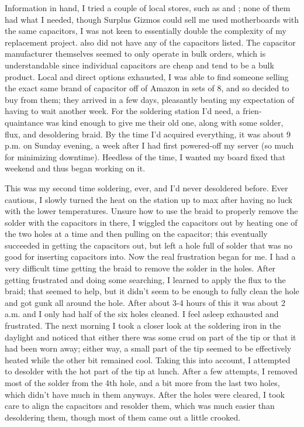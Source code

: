 \documentclass{article}
\begin{document}
Information in hand, I tried a couple of local stores, such as  and ; none of them had what I needed, though Surplus Gizmos could sell me used motherboards with the same capacitors, I was not keen to essentially double the complexity of my replacement project.   also did not have any of the capacitors listed.  The capacitor manufacturer themselves seemed to only operate in bulk orders, which is understandable since individual capacitors are cheap and tend to be a bulk product.  Local and direct options exhausted, I was able to find someone selling the exact same brand of capacitor off of Amazon in sets of 8, and so decided to buy from them; they arrived in a few days, pleasantly beating my expectation of having to wait another week.  For the soldering station I'd need, a frien-quaintance was kind enough to give me their old one, along with some solder, flux, and desoldering braid.  By the time I'd acquired everything, it was about 9 p.m. on Sunday evening, a week after I had first powered-off my server (so much for minimizing downtime).  Heedless of the time, I wanted my board fixed that weekend and thus began working on it.

This was my second time soldering, ever, and I'd never desoldered before.  Ever cautious, I slowly turned the heat on the station up to max after having no luck with the lower temperatures.  Unsure how to use the braid to properly remove the solder with the capacitors in there, I wiggled the capacitors out by heating one of the two holes at a time and then pulling on the capacitor; this eventually succeeded in getting the capacitors out, but left a hole full of solder that was no good for inserting capacitors into.  Now the real frustration began for me.  I had a very difficult time getting the braid to remove the solder in the holes.  After getting frustrated and doing some searching, I learned to apply the flux to the braid; that seemed to help, but it didn't seem to be enough to fully clean the hole and got gunk all around the hole.  After about 3-4 hours of this it was about 2 a.m. and I only had half of the six holes cleaned.  I feel asleep exhausted and frustrated.  The next morning I took a closer look at the soldering iron in the daylight and noticed that either there was some crud on part of the tip or that it had been worn away; either way, a small part of the tip seemed to be effectively heated while the other bit remained cool.  Taking this into account, I attempted to desolder with the hot part of the tip at lunch.  After a few attempts, I removed most of the solder from the 4th hole, and a bit more from the last two holes, which didn't have much in them anyways.  After the holes were cleared, I took care to align the capacitors and resolder them, which was much easier than desoldering them, though most of them came out a little crooked.
\end{document}
